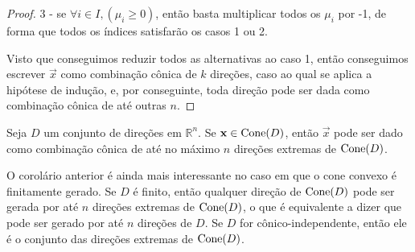 \begin{thm:caratheodory cones}
\begin{proof}
   3 - se $\forall i \in I, (\mu_i \geq 0)$, então basta multiplicar todos os
   $\mu_i$ por -1, de forma que todos os índices satisfarão os casos 1 ou 2.

   Visto que conseguimos reduzir todos as alternativas ao caso 1, então
   conseguimos escrever $\vec{x}$ como combinação cônica de $k$ direções, caso
   ao qual se aplica a hipótese de indução, e, por conseguinte,
   toda direção pode ser dada como combinação cônica de até
   outras $n$.
  \end{proof}
\end{thm:caratheodory cones}

\begin{cor:caratheodory cones}
  Seja $D$ um conjunto de direções em $\mathbb{R}^n$. Se $\mathbf{x} \in \mathrm{Cone}(D)$, então
  $\vec{x}$ pode ser dado como combinação cônica de até no máximo $n$ direções
  extremas de $\mathrm{Cone}(D)$.
\end{cor:caratheodory cones}

O corolário anterior é ainda mais interessante no caso em que o cone convexo
é finitamente gerado. Se $D$ é finito, então qualquer direção de
$\mathrm{Cone}(D)$ pode ser gerada por até $n$ direções extremas de $\mathrm{Cone}(D)$, o
que é equivalente a dizer que pode ser gerado por até $n$ direções de $D$.
Se $D$ for cônico-independente, então ele é o conjunto das direções
extremas de $\mathrm{Cone}(D)$.

